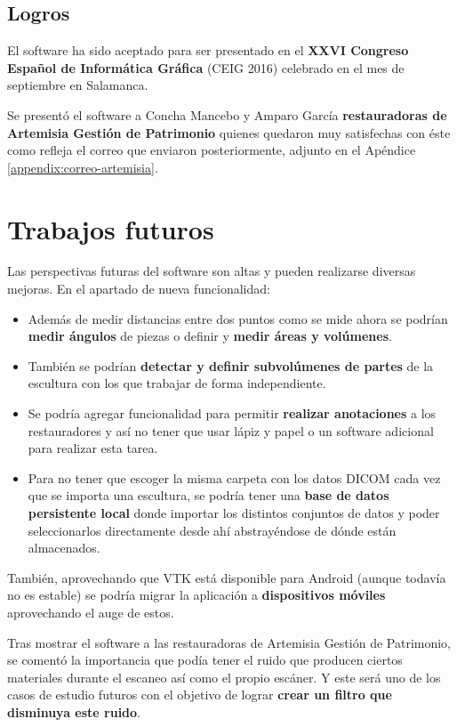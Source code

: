 \subsection{Logros}

El software ha sido aceptado para ser presentado en el \textbf{XXVI Congreso Español de Informática Gráfica} (CEIG 2016) celebrado en el mes de septiembre en Salamanca.

Se presentó el software a Concha Mancebo y Amparo García \textbf{restauradoras de Artemisia Gestión de Patrimonio} quienes quedaron muy satisfechas con éste como refleja el correo que enviaron posteriormente, adjunto en el Apéndice \ref{appendix:correo-artemisia}.

\section{Trabajos futuros}

Las perspectivas futuras del software son altas y pueden realizarse diversas mejoras. En el apartado de nueva funcionalidad:

\begin{itemize}
	\item Además de medir distancias entre dos puntos como se mide ahora se podrían \textbf{medir ángulos} de piezas o definir y \textbf{medir áreas y volúmenes}.
	\item También se podrían \textbf{detectar y definir subvolúmenes de partes} de la escultura con los que trabajar de forma independiente.
	\item Se podría agregar funcionalidad para permitir \textbf{realizar anotaciones} a los restauradores y así no tener que usar lápiz y papel o un software adicional para realizar esta tarea.
	\item Para no tener que escoger la misma carpeta con los datos DICOM cada vez que se importa una escultura, se podría tener una \textbf{base de datos persistente local} donde importar los distintos conjuntos de datos y poder seleccionarlos directamente desde ahí abstrayéndose de dónde están almacenados.
\end{itemize}

También, aprovechando que VTK está disponible para Android (aunque todavía no es estable) se podría migrar la aplicación a \textbf{dispositivos móviles} aprovechando el auge de estos.

Tras mostrar el software a las restauradoras de Artemisia Gestión de Patrimonio, se comentó la importancia que podía tener el ruido que producen ciertos materiales durante el escaneo así como el propio escáner. Y este será uno de los casos de estudio futuros con el objetivo de lograr \textbf{crear un filtro que disminuya este ruido}.